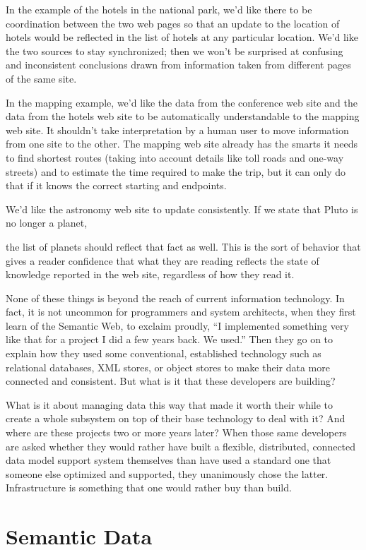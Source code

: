 In the example of the hotels in the national park, we'd like there to be
coordination between the two web pages so that an update to the location
of hotels would be reflected in the list of hotels at any particular
location. We'd like the two sources to stay synchronized; then we won't
be surprised at confusing and inconsistent conclusions drawn from
information taken from different pages of the same site.

In the mapping example, we'd like the data from the conference web site
and the data from the hotels web site to be automatically understandable
to the mapping web site. It shouldn't take interpretation by a human
user to move information from one site to the other. The mapping web
site already has the smarts it needs to find shortest routes (taking
into account details like toll roads and one-way streets) and to
estimate the time required to make the trip, but it can only do that if
it knows the correct starting and endpoints.

We'd like the astronomy web site to update consistently. If we state
that Pluto is no longer a planet,

the list of planets should reflect that fact as well. This is the sort
of behavior that gives a reader confidence that what they are reading
reflects the state of knowledge reported in the web site, regardless of
how they read it.

None of these things is beyond the reach of current information
technology. In fact, it is not uncommon for programmers and system
architects, when they first learn of the Semantic Web, to exclaim
proudly, ``I implemented something very like that for a project I did a
few years back. We used.'' Then they go on to explain how they used some
conventional, established technology such as relational databases, XML
stores, or object stores to make their data more connected and
consistent. But what is it that these developers are building?

What is it about managing data this way that made it worth their while
to create a whole subsystem on top of their base technology to deal with
it? And where are these projects two or more years later? When those
same developers are asked whether they would rather have built a
flexible, distributed, connected data model support system themselves
than have used a standard one that someone else optimized and supported,
they unanimously chose the latter. Infrastructure is something that one
would rather buy than build.

\section{Semantic Data}

